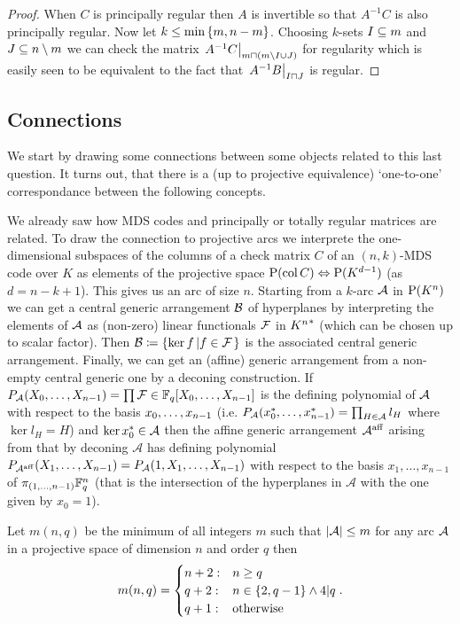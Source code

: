 \begin{proof}
    When $C$ is principally regular then $A$ is invertible so that $A^{-1}C$ is also principally regular. Now let $k\leq \min\set{m,n-m}$. Choosing $k$-sets $I\subseteq m$ and $J\subseteq n\setminus m$ we can check the matrix $\rest{A^{-1}C}_{m\setprod (m\setminus I\setjoin J)}$ for regularity which is easily seen to be equivalent to the fact that $\rest{A^{-1}B}_{I\setprod J}$ is regular.
\end{proof}

\subsection{Connections}

We start by drawing some connections between some objects related to this last question.
It turns out, that there is a (up to projective equivalence) `one-to-one' correspondance between the following concepts.

We already saw how MDS codes and principally or totally regular matrices are related.
To draw the connection to projective arcs we interprete the one-dimensional subspaces of the columns of a check matrix $C$ of an $(n,k)$-MDS code over $K$ as elements of the projective space $\P(\col C)\iso \P(K^{d-1})$ (as $d=n-k+1$). This gives us an arc of size $n$.
Starting from a $k$-arc $\mathcal{A}$ in $\P(K^n)$ we can get a central generic arrangement $\mathcal{B}$ of hyperplanes by interpreting the elements of $\mathcal{A}$ as (non-zero) linear functionals $\mathcal{F}$ in ${K^n}^{\ast}$ (which can be chosen up to scalar factor). Then $\cB\defeq\set{\ker f}[f\in \cF]$ is the associated central generic arrangement.
Finally, we can get an (affine) generic arrangement from a non-empty central generic one by a deconing construction. If $P_{\cA}(\range{X_0}{X_{n-1}})=\prod{\cF}\in\field{q}[X_0,\ldots,X_{n-1}]$ is the defining polynomial of $\mathcal{A}$ with respect to the basis $\range{x_0}{x_{n-1}}$ (i.e. $P_\cA(\range{\dual x_0}{\dual x_{n-1}})=\prod_{H\in\cA}{l_H}$ where $\ker l_H =H$) and $\ker {x}^{\ast}_0\in\mathcal{A}$ then the affine generic arrangement $\mathcal{A}^{\mathop\mathrm{aff}}$ arising from that by deconing $\mathcal{A}$ has defining polynomial $P_{\mathcal{A}^{\mathop\mathrm{aff}}}(X_1,\ldots,X_{n-1})=P_{\mathcal{A}}(1,X_1,\ldots,X_{n-1})$ with respect to the basis $x_1,\ldots,x_{n-1}$ of $\pi_{(1,\ldots,n-1)}\mathbb{F}_{q}^n$ (that is the intersection of the hyperplanes in $\mathcal{A}$ with the one given by $x_0=1$).

\begin{conjecture}
  Let $m(n,q)$ be the minimum of all integers $m$ such that $\left|\mathcal{A}\right|\leq m$ for any arc $\mathcal{A}$ in a projective space of dimension $n$ and order $q$ then
  $$
    m(n,q)=\begin{cases}
      n+2 :& n \geq q\\
      q+2 :& n\in\{2,q-1\} \wedge 4| q\\
      q+1 :& \textrm{otherwise}
    \end{cases}.
    $$
\end{conjecture}


